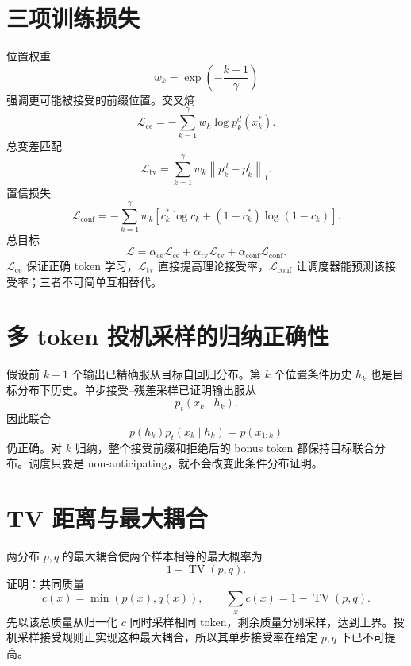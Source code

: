 \documentclass[UTF8,12pt,a4paper,fontset=none]{ctexart}
\numberwithin{equation}{section}
\newcommand{\Loss}{\mathcal{L}}
\newcommand{\norm}[1]{\left\lVert #1\right\rVert}
\begin{document}
\section{三项训练损失}
位置权重
\begin{equation}
 w_k=\exp\left(-\frac{k-1}{\gamma}\right)
\end{equation}
强调更可能被接受的前缀位置。交叉熵
\begin{equation}
 \Loss_{\mathrm{ce}}
 =-\sum_{k=1}^{\gamma}w_k\log p_k^d(x_k^*).
\end{equation}
总变差匹配
\begin{equation}
 \Loss_{\mathrm{tv}}
 =\sum_{k=1}^{\gamma}w_k\norm{p_k^d-p_k^t}_1.
\end{equation}
置信损失
\begin{equation}
 \Loss_{\mathrm{conf}}
 =-\sum_{k=1}^{\gamma}w_k
 [c_k^*\log c_k+(1-c_k^*)\log(1-c_k)].
\end{equation}
总目标
\begin{equation}
 \boxed{
 \Loss=\alpha_{\mathrm{ce}}\Loss_{\mathrm{ce}}
 +\alpha_{\mathrm{tv}}\Loss_{\mathrm{tv}}
 +\alpha_{\mathrm{conf}}\Loss_{\mathrm{conf}}.
 }
\end{equation}
$\Loss_{\mathrm{ce}}$ 保证正确 token 学习，$\Loss_{\mathrm{tv}}$ 直接提高理论接受率，$\Loss_{\mathrm{conf}}$ 让调度器能预测该接受率；三者不可简单互相替代。

\section{多 token 投机采样的归纳正确性}
假设前 $k-1$ 个输出已精确服从目标自回归分布。第 $k$ 个位置条件历史 $h_k$ 也是目标分布下历史。单步接受--残差采样已证明输出服从
\begin{equation}
 p_t(x_k\mid h_k).
\end{equation}
因此联合
\begin{equation}
 p(h_k)p_t(x_k\mid h_k)=p(x_{1:k})
\end{equation}
仍正确。对 $k$ 归纳，整个接受前缀和拒绝后的 bonus token 都保持目标联合分布。调度只要是 non-anticipating，就不会改变此条件分布证明。

\section{TV 距离与最大耦合}
两分布 $p,q$ 的最大耦合使两个样本相等的最大概率为
\begin{equation}
 1-\operatorname{TV}(p,q).
\end{equation}
证明：共同质量
\begin{equation}
 c(x)=\min(p(x),q(x)),
 \qquad \sum_xc(x)=1-\operatorname{TV}(p,q).
\end{equation}
先以该总质量从归一化 $c$ 同时采样相同 token，剩余质量分别采样，达到上界。投机采样接受规则正实现这种最大耦合，所以其单步接受率在给定 $p,q$ 下已不可提高。
\end{document}
